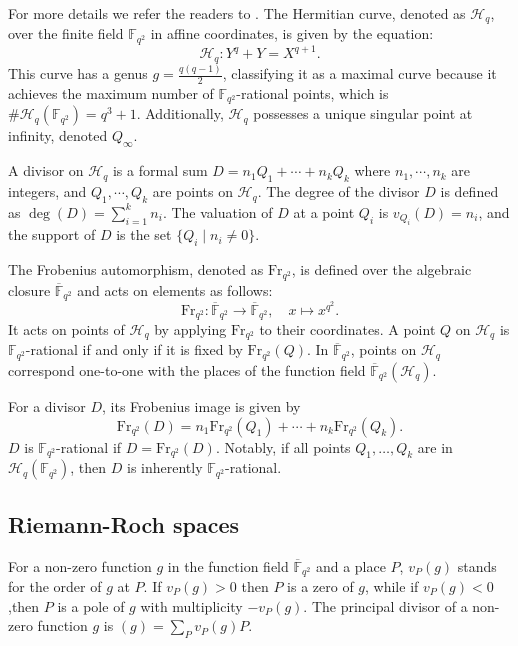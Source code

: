 \documentclass[entropy,article,submit,pdftex,moreauthors]{Definitions/mdpi}
\begin{document}
For more details we refer the readers to \cite{stichtenoth2009algebraic, stepanov2012codes,cossidente1999curves}. The Hermitian curve, denoted as $\mathscr{H}_q$, over the finite field $\mathbb{F}_{q^2}$ in affine coordinates, is given by the equation:
\[
	\mathscr{H}_q: Y^q + Y = X^{q+1}.
\]
This curve has a genus $g = \frac{q(q-1)}{2}$, classifying it as a maximal curve because it achieves the maximum number of $\mathbb{F}_{q^2}$-rational points, which is $\#\mathscr{H}_q(\mathbb{F}_{q^2}) = q^3 + 1$. Additionally, $\mathscr{H}_q$ possesses a unique singular point at infinity, denoted $Q_{\infty}$.

A divisor on $\mathscr{H}_q$ is a formal sum $D = n_1 Q_1 + \cdots + n_k Q_k$ where $n_1, \cdots, n_k$ are integers, and $Q_1, \cdots, Q_k$ are points on $\mathscr{H}_q$. The degree of the divisor $D$ is defined as $\deg(D) = \sum_{i=1}^k n_i$. The valuation of $D$ at a point $Q_i$ is $v_{Q_i}(D) = n_i$, and the support of $D$ is the set $\{ Q_i \mid n_i \neq 0 \}$.

The Frobenius automorphism, denoted as $\text{Fr}_{q^2}$, is defined over the algebraic closure $\overline{\mathbb{F}}_{q^2}$ and acts on elements as follows:
\[
	\text{Fr}_{q^2}: \overline{\mathbb{F}}_{q^2} \to \overline{\mathbb{F}}_{q^2}, \quad x \mapsto x^{q^2}.
\]
It acts on points of $\mathscr{H}_q$ by applying $\text{Fr}_{q^2}$ to their coordinates. A point $Q$ on $\mathscr{H}_q$ is $\mathbb{F}_{q^2}$-rational if and only if it is fixed by $\text{Fr}_{q^2}(Q)$. In $\overline{\mathbb{F}}_{q^2}$, points on $\mathscr{H}_q$ correspond one-to-one with the places of the function field $\overline{\mathbb{F}}_{q^2}(\mathscr{H}_q)$.

For a divisor $D$, its Frobenius image is given by
\[
	\text{Fr}_{q^2}(D) = n_1 \text{Fr}_{q^2}(Q_1) + \cdots + n_k \text{Fr}_{q^2}(Q_k).
\]
$D$ is $\mathbb{F}_{q^2}$-rational if $D = \text{Fr}_{q^2}(D)$. Notably, if all points $Q_1, \ldots, Q_k$ are in $\mathscr{H}_q(\mathbb{F}_{q^2})$, then $D$ is inherently $\mathbb{F}_{q^2}$-rational.

\subsection{Riemann-Roch spaces}

For a non-zero function $g$ in the function field $\overline{\mathbb{F}}_{q^2}$ and a place $P$, $v_P(g)$ stands for the order of $g$ at $P$. If $v_P(g) > 0$ then $P$ is a zero of $g$, while if $v_P(g) < 0 $,then $P$ is a pole of $g$ with multiplicity  $-v_P(g)$. The principal divisor of a non-zero function $g$ is $(g)= \sum_{P}v_P(g) P$.
\end{document}

